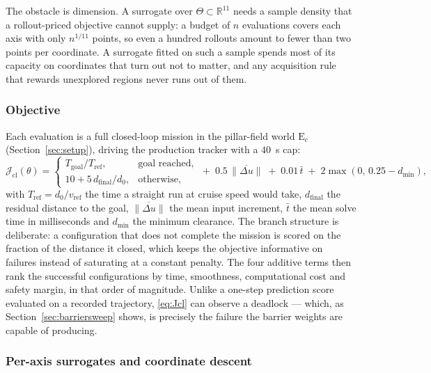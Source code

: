 \documentclass[11pt,a4paper]{article}
\newcommand{\R}{\mathbb{R}}
\begin{document}
The obstacle is dimension. A surrogate over $\Theta\subset\R^{11}$ needs a sample density that a rollout-priced
objective cannot supply: a budget of $n$ evaluations covers each axis with only $n^{1/11}$ points, so even a
hundred rollouts amount to fewer than two points per coordinate. A surrogate fitted on such a sample spends
most of its capacity on coordinates that turn out not to matter, and any acquisition rule that rewards
unexplored regions never runs out of them.

\subsubsection{Objective}

Each evaluation is a full closed-loop mission in the pillar-field world $\mathrm{E}_c$
(Section~\ref{sec:setup}), driving the production tracker with a $40$~s cap:
\begin{equation}
  \mathcal{J}_{\mathrm{cl}}(\theta)=
  \begin{cases}
    T_{\mathrm{goal}}/T_{\mathrm{ref}}, & \text{goal reached},\\[2pt]
    10+5\,d_{\mathrm{final}}/d_0, & \text{otherwise},
  \end{cases}
  \;+\;0.5\,\overline{\|\Delta u\|}\;+\;0.01\,\bar t\;+\;2\max(0,\,0.25-d_{\min}),
  \label{eq:Jcl}
\end{equation}
with $T_{\mathrm{ref}}=d_0/v_{\mathrm{ref}}$ the time a straight run at cruise speed would take,
$d_{\mathrm{final}}$ the residual distance to the goal, $\overline{\|\Delta u\|}$ the mean input increment,
$\bar t$ the mean solve time in milliseconds and $d_{\min}$ the minimum clearance. The branch structure is
deliberate: a configuration that does not complete the mission is scored on the fraction of the distance it
closed, which keeps the objective informative on failures instead of saturating at a constant penalty. The
four additive terms then rank the successful configurations by time, smoothness, computational cost and
safety margin, in that order of magnitude. Unlike a one-step prediction score evaluated on a recorded
trajectory, \eqref{eq:Jcl} can observe a deadlock --- which, as Section~\ref{sec:barriersweep} shows, is
precisely the failure the barrier weights are capable of producing.

\subsubsection{Per-axis surrogates and coordinate descent}
\end{document}

